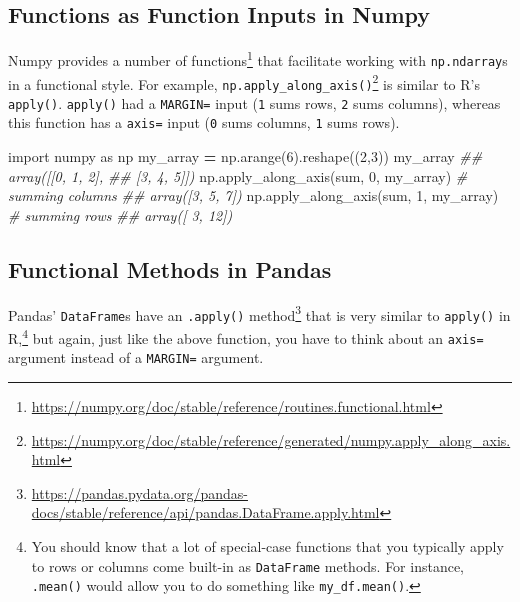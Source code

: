 \documentclass[
  12pt,
  krantz2]{krantz}
\makeatletter
\newenvironment{Shaded}{\begin{snugshade}}{\end{snugshade}}
\newcommand{\BuiltInTok}[1]{#1}
\newcommand{\CommentTok}[1]{\textcolor[rgb]{0.37,0.37,0.37}{\textit{#1}}}
\newcommand{\DecValTok}[1]{\textcolor[rgb]{0.06,0.06,0.06}{#1}}
\newcommand{\ImportTok}[1]{#1}
\newcommand{\NormalTok}[1]{#1}
\newcommand{\OperatorTok}[1]{\textcolor[rgb]{0.43,0.43,0.43}{\textbf{#1}}}
\renewcommand{\href}[2]{#2\footnote{\url{#1}}}
\newenvironment{kframe}{%
\medskip{}
\setlength{\fboxsep}{.8em}
 \def\at@end@of@kframe{}%
 \ifinner\ifhmode%
  \def\at@end@of@kframe{\end{minipage}}%
  \begin{minipage}{\columnwidth}%
 \fi\fi%
 \def\FrameCommand##1{\hskip\@totalleftmargin \hskip-\fboxsep
 \colorbox{shadecolor}{##1}\hskip-\fboxsep
     \hskip-\linewidth \hskip-\@totalleftmargin \hskip\columnwidth}%
 \MakeFramed {\advance\hsize-\width
   \@totalleftmargin\z@ \linewidth\hsize
   \@setminipage}}%
 {\par\unskip\endMakeFramed%
 \at@end@of@kframe}
\renewenvironment{Shaded}{\begin{kframe}}{\end{kframe}}
\makeatother
\begin{document}
\hypertarget{functions-as-function-inputs-in-numpy}{%
\subsection{Functions as Function Inputs in Numpy}\label{functions-as-function-inputs-in-numpy}}

Numpy provides a \href{https://numpy.org/doc/stable/reference/routines.functional.html}{number of functions} that facilitate working with \texttt{np.ndarray}s in a functional style. For example, \href{https://numpy.org/doc/stable/reference/generated/numpy.apply_along_axis.html}{\texttt{np.apply\_along\_axis()}} is similar to R's \texttt{apply()}. \texttt{apply()} had a \texttt{MARGIN=} input (\texttt{1} sums rows, \texttt{2} sums columns), whereas this function has a \texttt{axis=} input (\texttt{0} sums columns, \texttt{1} sums rows).

\begin{Shaded}
\begin{Highlighting}[]
\ImportTok{import}\NormalTok{ numpy }\ImportTok{as}\NormalTok{ np}
\NormalTok{my\_array }\OperatorTok{=}\NormalTok{ np.arange(}\DecValTok{6}\NormalTok{).reshape((}\DecValTok{2}\NormalTok{,}\DecValTok{3}\NormalTok{))}
\NormalTok{my\_array}
\CommentTok{\#\# array([[0, 1, 2],}
\CommentTok{\#\#        [3, 4, 5]])}
\NormalTok{np.apply\_along\_axis(}\BuiltInTok{sum}\NormalTok{, }\DecValTok{0}\NormalTok{, my\_array) }\CommentTok{\# summing columns}
\CommentTok{\#\# array([3, 5, 7])}
\NormalTok{np.apply\_along\_axis(}\BuiltInTok{sum}\NormalTok{, }\DecValTok{1}\NormalTok{, my\_array) }\CommentTok{\# summing rows}
\CommentTok{\#\# array([ 3, 12])}
\end{Highlighting}
\end{Shaded}

\hypertarget{functional-methods-in-pandas}{%
\subsection{Functional Methods in Pandas}\label{functional-methods-in-pandas}}

Pandas' \texttt{DataFrame}s have an \href{https://pandas.pydata.org/pandas-docs/stable/reference/api/pandas.DataFrame.apply.html}{\texttt{.apply()} method} that is very similar to \texttt{apply()} in R,\footnote{You should know that a lot of special-case functions that you typically apply to rows or columns come built-in as \texttt{DataFrame} methods. For instance, \texttt{.mean()} would allow you to do something like \texttt{my\_df.mean()}.} but again, just like the above function, you have to think about an \texttt{axis=} argument instead of a \texttt{MARGIN=} argument.
\end{document}
